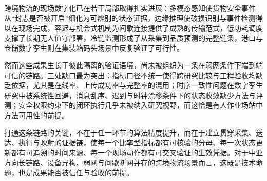 \documentclass[11pt,a4paper]{article}
\begin{document}
跨境物流的现场数字化已在若干局部取得扎实进展：多模态感知使货物安全事件从“封志是否被开启”细化为可辨别的状态证据，边缘推理使破损识别与事件检测得以在现场完成，容迟与机会式机制为间歇连接提供了成熟的传输范式，低功耗调度支撑了长期无人值守部署，冷链监测形成了从采集到品质预测的完整链条，港口与仓储数字孪生则在集装箱码头场景中反复验证了可行性。

然而这些成果生长于彼此隔离的验证语境，尚未被组织为一条在弱网条件下端到端可信的链路。三处缺口最为突出：指标口径不统一使得跨研究比较与工程验收均缺乏依据，尤其是在线率、上传成功率与完整率的混用；时序一致性问题在数字孪生研究中被系统性回避，消息乱序、迟到与时钟漂移条件下的状态收敛缺少方法与评测；安全权限约束下的闭环执行几乎未被纳入研究视野，而这恰是有人作业场站中方法可用性的前提。

打通这条链路的关键，不在于任一环节的算法精度提升，而在于建立贯穿采集、送达、执行与映射的证据链，使每一个比率型指标都有可核验的分母、每一次状态更新都有可追溯的时间来源、每一个现场动作都有可交叉验证的生效凭据。对于中亚方向长链路、设备异构、弱网与间歇断网并存的跨境物流场景而言，这既是技术命题，也是成果能否被信任与验收的前提。



\end{document}
